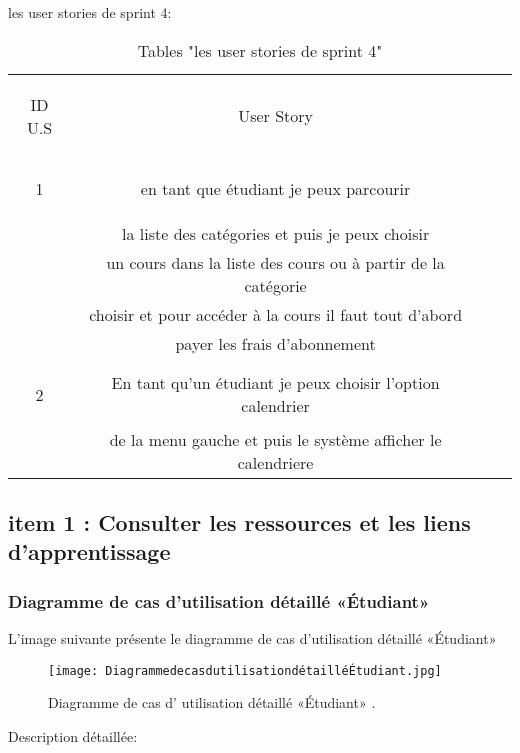 \begin{table}[h]
	{\Large \color{cyan} les user stories de sprint 4:}
	
	\begin{center}
		\begin{tabular}{>{\begin{bf} } c <{\end{bf}}ccc}
			
			\rowcolor{-blue!20!red}ID U.S & \begin{bf}User Story \end{bf}  & \\
			
			1 &en tant que étudiant je peux parcourir \\
			&la liste  des catégories et puis je peux choisir \\
			&un cours dans la liste des cours ou à partir de la catégorie\\
			& choisir et pour accéder à la cours il faut tout d'abord\\
			& payer les frais d'abonnement
			\\
			& \\
			2 & En tant qu'un étudiant je peux choisir l'option
			calendrier\\
			& de la menu gauche et puis le système afficher le calendriere \\
			
			
		\end{tabular}
	\end{center}
	\caption{Tables  "les user stories de sprint 4"}
	\label{les user stories de sprint 4}
\end{table}



\clearpage
\clearpage
\subsection{item 1 : Consulter les ressources et les liens d'apprentissage}
\subsubsection{Diagramme de cas d’utilisation  détaillé «Étudiant» }
L’image suivante présente le diagramme de cas d’utilisation détaillé «Étudiant»
\begin{figure}[ht]
	\centering
	\texttt{[image: DiagrammedecasdutilisationdétailléÉtudiant.jpg]}
	\caption{Diagramme de cas d' utilisation  détaillé «Étudiant» .}
	\label{fig:Diagramme de cas d' utilisation  détaillé Étudiant  }
\end{figure}
\FloatBarrier
{\Large \color{cyan} Description détaillée:}

